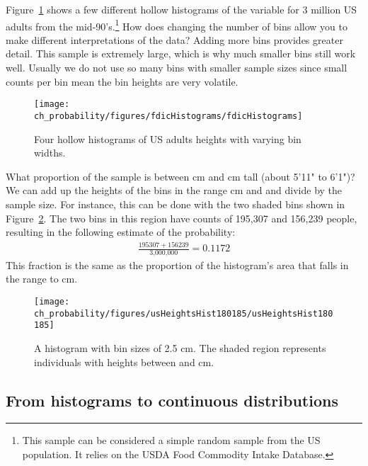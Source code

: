 \begin{example}{Figure~\ref{fdicHistograms} shows a few different hollow histograms of the variable  for 3 million US adults from the mid-90's.\footnote{This sample can be considered a simple random sample from the US population. It relies on the USDA Food Commodity Intake Database.} How does changing the number of bins allow you to make different interpretations of the data?}\label{usHeights}
Adding more bins provides greater detail. This sample is extremely large, which is why much smaller bins still work well. Usually we do not use so many bins with smaller sample sizes since small counts per bin mean the bin heights are very volatile.
\end{example}

\begin{figure}[ht]
\centering
\texttt{[image: ch\_probability/figures/fdicHistograms/fdicHistograms]}
\caption{Four hollow histograms of US adults heights with varying bin widths.}
\label{fdicHistograms}
\end{figure}

\begin{example}{What proportion of the sample is between  cm and  cm tall (about 5'11" to 6'1")?}\label{contDistProb}
We can add up the heights of the bins in the range  cm and  and divide by the sample size. For instance, this can be done with the two shaded bins shown in Figure~\ref{usHeightsHist180185}. The two bins in this region have counts of 195,307 and 156,239 people, resulting in the following estimate of the probability:
\begin{eqnarray*}
\frac{195307+156239}{\text{3,000,000}} = 0.1172
\end{eqnarray*}
This fraction is the same as the proportion of the histogram's area that falls in the range  to  cm.
\end{example}

\begin{figure}
\centering
\texttt{[image: ch\_probability/figures/usHeightsHist180185/usHeightsHist180185]}
\caption{A histogram with bin sizes of 2.5 cm. The shaded region represents individuals with heights between  and  cm. }
\label{usHeightsHist180185}
\end{figure}

\subsection{From histograms to continuous distributions}

